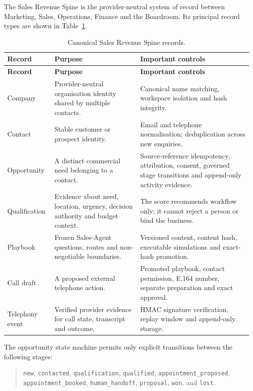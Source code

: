 The Sales Revenue Spine is the provider-neutral system of record between Marketing, Sales, Operations, Finance and the Boardroom. Its principal record types are shown in Table~\ref{tab:sales-spine-records}.

\begin{longtable}{p{}p{}p{}}
\caption{Canonical Sales Revenue Spine records.}\label{tab:sales-spine-records}\\
\toprule
\textbf{Record} & \textbf{Purpose} & \textbf{Important controls} \\
\midrule
\endfirsthead
\toprule
\textbf{Record} & \textbf{Purpose} & \textbf{Important controls} \\
\midrule
\endhead
Company & Provider-neutral organisation identity shared by multiple contacts. & Canonical name matching, workspace isolation and hash integrity. \\
Contact & Stable customer or prospect identity. & Email and telephone normalisation; deduplication across new enquiries. \\
Opportunity & A distinct commercial need belonging to a contact. & Source-reference idempotency, attribution, consent, governed stage transitions and append-only activity evidence. \\
Qualification & Evidence about need, location, urgency, decision authority and budget context. & The score recommends workflow only; it cannot reject a person or bind the business. \\
Playbook & Frozen Sales-Agent questions, routes and non-negotiable boundaries. & Versioned content, content hash, executable simulations and exact-hash promotion. \\
Call draft & A proposed external telephone action. & Promoted playbook, contact permission, E.164 number, separate preparation and exact approval. \\
Telephony event & Verified provider evidence for call state, transcript and outcome. & HMAC signature verification, replay window and append-only storage. \\
\bottomrule
\end{longtable}

The opportunity state machine permits only explicit transitions between the following stages:

\begin{quote}
\texttt{new}, \texttt{contacted}, \texttt{qualification}, \texttt{qualified},
\texttt{appointment\_proposed}, \texttt{appointment\_booked},
\texttt{human\_handoff}, \texttt{proposal}, \texttt{won}, and \texttt{lost}.
\end{quote}

